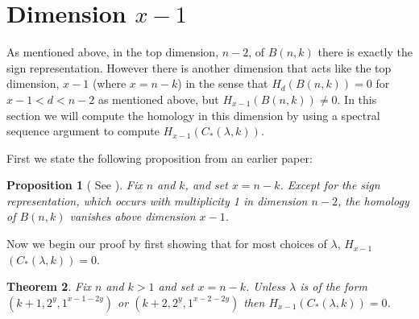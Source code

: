 \documentclass{amsart}
\newtheorem{theorem}{Theorem}[section]
\newtheorem{proposition}[theorem]{Proposition}
\begin{document}
\section{Dimension $x-1$} \label{S:x-1}

As mentioned above, in the top dimension, $n-2$, of $B(n, k)$ there is exactly the sign representation. However there is
another dimension that acts like the top dimension, $x-1$ (where $x=n-k$) in the sense that $H_d(B(n, k)) = 0 $ for 
$ x-1 < d < n-2$ as mentioned above, but $H_{x-1}(B(n, k)) \ne 0$. In this section we will compute the homology in this 
dimension by using a spectral sequence argument to compute $H_{x-1}(C_*(\lambda, k))$.

First we state the following proposition from an earlier paper:

\begin{proposition}[ See \cite{S1}] \label{P:uppertri} Fix $n$ and $k$, and set $x=n-k$. 
  Except for the sign representation, which occurs with multiplicity 1 in
  dimension $n-2$, the homology of $B(n, k)$ vanishes above dimension $x-1$. 
\end{proposition}

Now we begin our proof by first showing that for most choices of $\lambda$, $H_{x-1}$ $(C_*(\lambda, k)) = 0$. 

\begin{theorem}\label{T:topdim} Fix $n$ and $k > 1$ and set $x=n-k$. Unless $\lambda$ is of the form $(k+1, 2^y, 1^{x-1-2y})$ or 
$(k+2, 2^y, 1^{x-2-2y})$ then $H_{x-1}(C_*(\lambda, k))=0$. 
\end{theorem}
\end{document}
